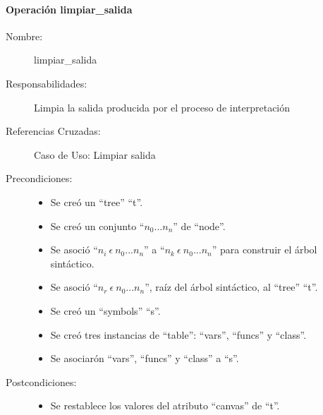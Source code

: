 \paragraph{Operación limpiar\_salida}
\FloatBarrier
\begin{framed}
	\begin{description}
		\item [Nombre:] limpiar\_salida
		\item [Responsabilidades:] Limpia la salida producida por el proceso de interpretación
		\item [Referencias Cruzadas: ] Caso de Uso: Limpiar salida
      \item [Precondiciones:] \hfill
         \begin {itemize}
         \item Se creó un ``tree'' ``t''.
         \item Se creó un conjunto ``$n_0...n_n$'' de ``node''.
         \item Se asoció ``$n_i\ \epsilon\ n_0...n_n$'' a ``$n_k\ \epsilon\ n_0...n_n$'' para construir el árbol sintáctico.
         \item Se asoció  ``$n_r\ \epsilon\ n_0...n_n$'', raíz del árbol sintáctico, al ``tree'' ``t''.
         \item Se creó un ``symbols'' ``s''.
         \item Se creó tres instancias de ``table'': ``vars'', ``funcs'' y ``class''.
         \item Se asociarón ``vars'', ``funcs'' y ``class'' a ``s''.
      \end{itemize}
      \item [Postcondiciones:] \hfill
      \begin {itemize}
         \item Se restablece los valores del atributo ``canvas'' de ``t''.
      \end{itemize}
	\end{description} 
\end{framed}
\FloatBarrier

